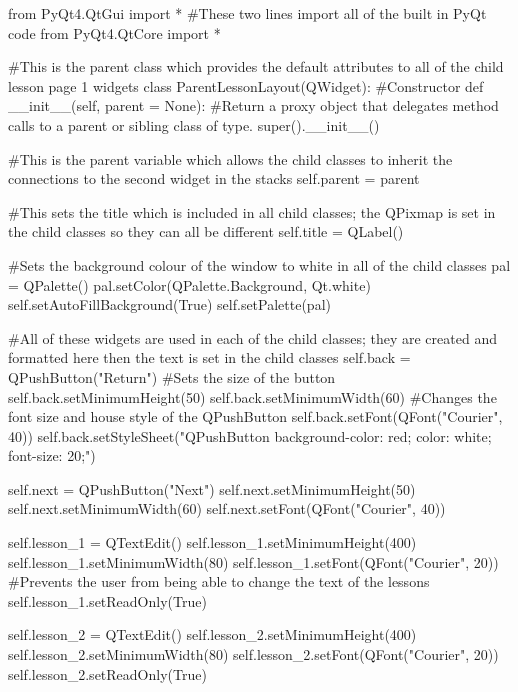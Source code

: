 \begin{landscape}
\begin{python}
from PyQt4.QtGui import * #These two lines import all of the built in PyQt code
from PyQt4.QtCore import *

#This is the parent class which provides the default attributes to all of the child lesson page 1 widgets
class ParentLessonLayout(QWidget):
    #Constructor
    def __init__(self, parent = None):
        #Return a proxy object that delegates method calls to a parent or sibling class of type.
        super().__init__()

        #This is the parent variable which allows the child classes to inherit the connections to the second widget in the stacks       
        self.parent = parent

        #This sets the title which is included in all child classes; the QPixmap is set in the child classes so they can all be different
        self.title = QLabel()

        #Sets the background colour of the window to white in all of the child classes
        pal = QPalette()
        pal.setColor(QPalette.Background, Qt.white)
        self.setAutoFillBackground(True)
        self.setPalette(pal)

        #All of these widgets are used in each of the child classes; they are created and formatted here then the text is set in the child classes
        self.back = QPushButton("Return")
        #Sets the size of the button
        self.back.setMinimumHeight(50)
        self.back.setMinimumWidth(60)
        #Changes the font size and house style of the QPushButton
        self.back.setFont(QFont("Courier", 40))
        self.back.setStyleSheet("QPushButton {background-color: red; color: white; font-size: 20;}")
        
        self.next = QPushButton("Next")
        self.next.setMinimumHeight(50)
        self.next.setMinimumWidth(60)
        self.next.setFont(QFont("Courier", 40))

        self.lesson_1 = QTextEdit()
        self.lesson_1.setMinimumHeight(400)
        self.lesson_1.setMinimumWidth(80)
        self.lesson_1.setFont(QFont("Courier", 20))
        #Prevents the user from being able to change the text of the lessons
        self.lesson_1.setReadOnly(True)
        
        self.lesson_2 = QTextEdit()
        self.lesson_2.setMinimumHeight(400)
        self.lesson_2.setMinimumWidth(80)
        self.lesson_2.setFont(QFont("Courier", 20))
        self.lesson_2.setReadOnly(True)


\end{python}
\end{landscape}
